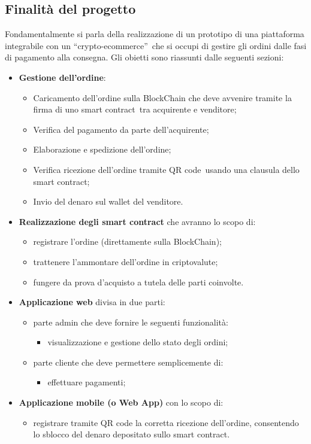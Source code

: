 \subsection{Finalità del progetto}
Fondamentalmente si parla della realizzazione di un prototipo di una piattaforma integrabile con un “crypto-ecommerce”\glo\, che si occupi di gestire gli ordini dalle fasi di pagamento alla consegna.
\newline
Gli obietti sono riassunti dalle seguenti sezioni:
\begin{itemize}
	\item \textbf{Gestione dell'ordine}:
		\begin{itemize}
			\item Caricamento dell'ordine sulla BlockChain\glo{} che deve avvenire tramite la firma di uno {smart contract}\glo\ tra acquirente e venditore;
			\item Verifica del pagamento da parte dell'acquirente;
			\item Elaborazione e spedizione dell'ordine;
			\item Verifica ricezione dell'ordine tramite QR code\glo\ usando una clausula dello smart contract;
			\item Invio del denaro sul wallet del venditore.
		\end{itemize}
	\item \textbf{Realizzazione degli smart contract} che avranno lo scopo di:
		\begin{itemize}
			\item registrare l'ordine (direttamente sulla BlockChain);
			\item trattenere l'ammontare dell'ordine in criptovalute\glo{};
			\item fungere da prova d'acquisto a tutela delle parti coinvolte.
		\end{itemize}
	\item \textbf{Applicazione web} divisa in due parti:
		\begin{itemize}
			\item parte admin che deve fornire le seguenti funzionalità:
			\begin{itemize}
				\item visualizzazione e gestione dello stato degli ordini;
			\end{itemize}
			\item parte cliente che deve permettere semplicemente di:
			\begin{itemize}
				\item effettuare pagamenti;
			\end{itemize}
		\end{itemize}
	\item \textbf{Applicazione mobile (o Web App)} con lo scopo di:
		\begin{itemize}
			\item registrare tramite QR code la corretta ricezione dell'ordine, consentendo lo sblocco del denaro depositato sullo smart contract.
		\end{itemize}
\end{itemize}

